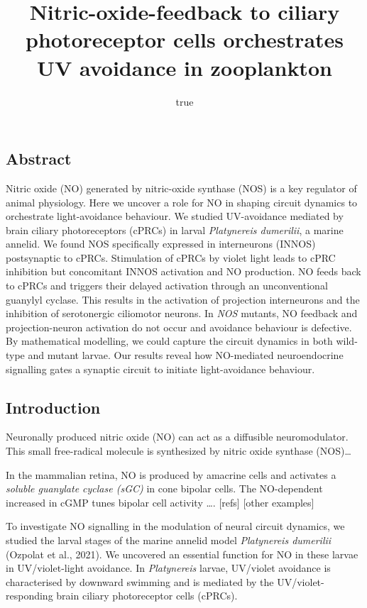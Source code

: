 \documentclass[
  10pt,
  onecolumn]{article}
\title{Nitric-oxide-feedback to ciliary photoreceptor cells orchestrates
UV avoidance in zooplankton}
\author{true}
\date{}
\begin{document}
\maketitle

\hypertarget{abstract}{%
\subsection{Abstract}\label{abstract}}

Nitric oxide (NO) generated by nitric-oxide synthase (NOS) is a key
regulator of animal physiology. Here we uncover a role for NO in shaping
circuit dynamics to orchestrate light-avoidance behaviour. We studied
UV-avoidance mediated by brain ciliary photoreceptors (cPRCs) in larval
\emph{Platynereis dumerilii}, a marine annelid. We found NOS
specifically expressed in interneurons (INNOS) postsynaptic to cPRCs.
Stimulation of cPRCs by violet light leads to cPRC inhibition but
concomitant INNOS activation and NO production. NO feeds back to cPRCs
and triggers their delayed activation through an unconventional guanylyl
cyclase. This results in the activation of projection interneurons and
the inhibition of serotonergic ciliomotor neurons. In \emph{NOS}
mutants, NO feedback and projection-neuron activation do not occur and
avoidance behaviour is defective. By mathematical modelling, we could
capture the circuit dynamics in both wild-type and mutant larvae. Our
results reveal how NO-mediated neuroendocrine signalling gates a
synaptic circuit to initiate light-avoidance behaviour.

\hypertarget{introduction}{%
\subsection{Introduction}\label{introduction}}

Neuronally produced nitric oxide (NO) can act as a diffusible
neuromodulator. This small free-radical molecule is synthesized by
nitric oxide synthase (NOS)\ldots{}

In the mammalian retina, NO is produced by amacrine cells and activates
a \emph{soluble guanylate cyclase (sGC)} in cone bipolar cells. The
NO-dependent increased in cGMP tunes bipolar cell activity \ldots.
{[}refs{]} {[}other examples{]}

To investigate NO signalling in the modulation of neural circuit
dynamics, we studied the larval stages of the marine annelid model
\emph{Platynereis dumerilii} (Ozpolat et al., 2021). We uncovered an
essential function for NO in these larvae in UV/violet-light avoidance.
In \emph{Platynereis} larvae, UV/violet avoidance is characterised by
downward swimming and is mediated by the UV/violet-responding brain
ciliary photoreceptor cells (cPRCs).
\end{document}
